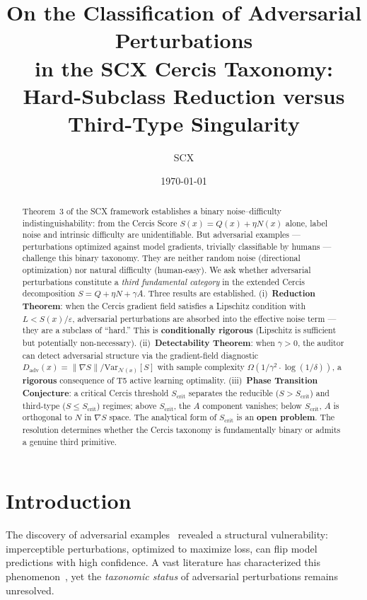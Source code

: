 \documentclass[12pt,a4paper]{article}
\title{\bfseries On the Classification of Adversarial Perturbations\\
in the SCX Cercis Taxonomy:\\
Hard-Subclass Reduction versus Third-Type Singularity}
\author{SCX}
\date{\today}
\begin{document}
\maketitle

\begin{abstract}
Theorem~3 of the SCX framework establishes a binary noise--difficulty
indistinguishability: from the Cercis Score $S(x) = Q(x) + \eta N(x)$
alone, label noise and intrinsic difficulty are unidentifiable.  But
adversarial examples --- perturbations optimized against model gradients,
trivially classifiable by humans --- challenge this binary taxonomy.  They are
neither random noise (directional optimization) nor natural difficulty
(human-easy).  We ask whether adversarial perturbations constitute a
\emph{third fundamental category} in the extended Cercis decomposition
$S = Q + \eta N + \gamma A$.  Three results are established.
(i)~\textbf{Reduction Theorem}: when the Cercis gradient field satisfies a
Lipschitz condition with $L < S(x)/\varepsilon$, adversarial perturbations
are absorbed into the effective noise term --- they are a subclass of
``hard.''  This is \textbf{conditionally rigorous} (Lipschitz is sufficient
but potentially non-necessary).  (ii)~\textbf{Detectability Theorem}: when
$\gamma > 0$, the auditor can detect adversarial structure via the
gradient-field diagnostic $D_{\mathrm{adv}}(x) = \|\nabla S\| /
\mathrm{Var}_{\mathcal{N}(x)}[S]$ with sample complexity
$\Omega(1/\gamma^2 \cdot \log(1/\delta))$, a \textbf{rigorous} consequence
of T5 active learning optimality.  (iii)~\textbf{Phase Transition
Conjecture}: a critical Cercis threshold $S_{\mathrm{crit}}$ separates
the reducible ($S > S_{\mathrm{crit}}$) and third-type ($S \leq
S_{\mathrm{crit}}$) regimes; above $S_{\mathrm{crit}}$, the $A$ component
vanishes; below $S_{\mathrm{crit}}$, $A$ is orthogonal to $N$ in $\nabla S$
space.  The analytical form of $S_{\mathrm{crit}}$ is an \textbf{open
problem}.  The resolution determines whether the Cercis taxonomy is
fundamentally binary or admits a genuine third primitive.
\end{abstract}

\section{Introduction}

The discovery of adversarial examples~\citep{szegedy2014intriguing,
goodfellow2015explaining} revealed a structural vulnerability: imperceptible
perturbations, optimized to maximize loss, can flip model predictions with
high confidence.  A vast literature has characterized this
phenomenon~\citep{madry2018towards, tsipras2019robustness,
ilyas2019adversarial, carlini2017towards}, yet the \emph{taxonomic status}
of adversarial perturbations remains unresolved.
\end{document}
